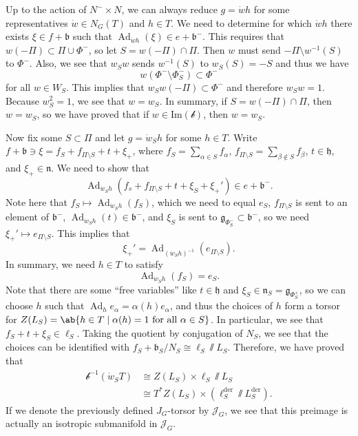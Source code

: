 \documentclass{amsart}
\theoremstyle{definition}
\theoremstyle{remark}
\theoremstyle{plain}
\theoremstyle{definition}
\theoremstyle{remark}
\newcommand{\Ima}{\mathrm{Im}}
\newcommand{\g}{\mathfrak{g}}
\newcommand{\h}{\mathfrak{h}}
\newcommand{\n}{\mathfrak{n}}
\renewcommand{\b}{\mathfrak{b}}
\newcommand{\mc}[1]{\mathcal{#1}}
\newcommand{\on}[1]{\operatorname{#1}}
\newcommand{\1}{\mathbf{1}}
\newcommand{\2}{\mathbf{2}}
\newcommand{\3}{\mathbf{3}}
\DeclareMathOperator{\Ad}{Ad}
\begin{document}
    Up to the action of \(N^- \times N\), we can always reduce \(g = \dot{w}h\) for some representatives \(\dot{w} \in N_G(T)\) and \(h \in T\). We need to determine for which \(\dot{w}h\) there exists \(\xi \in f + \b\) such that \(\Ad_{\dot{w}h}(\xi) \in e + \b^-\). This requires that \(w(-\Pi) \subset \Pi \cup \Phi^-\), so let \(S = w(-\Pi) \cap \Pi\). Then \(w\) must send \(-\Pi \setminus w^{-1}(S)\) to \(\Phi^-\). Also, we see that \(w_S w\) sends \(w^{-1}(S)\) to \(w_S(S) = -S\) and thus we have
    \[ w(\Phi^- \setminus \Phi_S^-) \subset \Phi^- \]
    for all \(w \in W_S\). This implies that \(w_S w(-\Pi) \subset \Phi^-\) and therefore \(w_S w = 1\). Because \(w_S^2 = 1\), we see that \(w = w_S\). In summary, if \(S = w(-\Pi) \cap \Pi\), then \(w = w_S\), so we have proved that if \(w \in \Ima(\mc{b})\), then \(w = w_S\).

    Now fix some \(S \subset \Pi\) and let \(g = \dot{w}_S h\) for some \(h \in T\). Write \(f + \b \ni \xi = f_S + f_{\Pi \setminus S} + t + \xi_+\), where \(f_S = \sum_{\alpha \in S} f_{\alpha}\), \(f_{\Pi \setminus S} = \sum_{\beta \notin S} f_{\beta}\), \(t \in \h\), and \(\xi_+ \in \n\). We need to show that
    \[ \Ad_{\dot{w}_S h}(f_s + f_{\Pi \setminus S} + t + \xi_S + \xi_+') \in e + \b^-. \]
    Note here that \(f_S \mapsto \Ad_{\dot{w}_S h}(f_S)\), which we need to equal \(e_S\), \(f_{\Pi \setminus S}\) is sent to an element of \(\b^-\), \(\Ad_{\dot{w}_S h} (t) \in \b^-\), and \(\xi_S\) is sent to \(\g_{\Phi_S^-} \subset \b^-\), so we need \(\xi_+' \mapsto e_{\Pi \setminus S}\). This implies that
    \[ \xi_+' = \Ad_{(\dot{w}_S h)^{-1}} (e_{\Pi \setminus S}). \]
    In summary, we need \(h \in T\) to satisfy
    \[ \Ad_{\dot{w}_S h}(f_S) = e_S. \]
    Note that there are some ``free variables'' like \(t \in \h\) and \(\xi_S \in \n_S = \g_{\Phi_S^+}\), so we can choose \(h\) such that \(\Ad_h e_{\alpha} = \alpha(h) e_{\alpha}\), and thus the choices of \(h\) form a torsor for \(Z(L_S) = \ab\{ h \in T \mid \alpha (h) = 1 \text{ for all } \alpha \in S\}\). In particular, we see that \(f_S + t + \xi_S \in \ell_S\). Taking the quotient by conjugation of \(N_S\), we see that the choices can be identified with \(f_S + \b_S / N_S \cong \ell_S \sslash L_S\). Therefore, we have proved that 
    \begin{align*}
        \mc{b}^{-1}(\dot{w}_S T) &\cong Z(L_S) \times \ell_S \sslash L_S \\
        &\cong T^* Z(L_S) \times (\ell_S^{\on{der}} \sslash L_S^{\on{der}}).
    \end{align*}
    If we denote the previously defined \(J_G\)-torsor by \(\mc{J}_G\), we see that this preimage is actually an isotropic submanifold in \(\mc{J}_G\).
\end{document}
